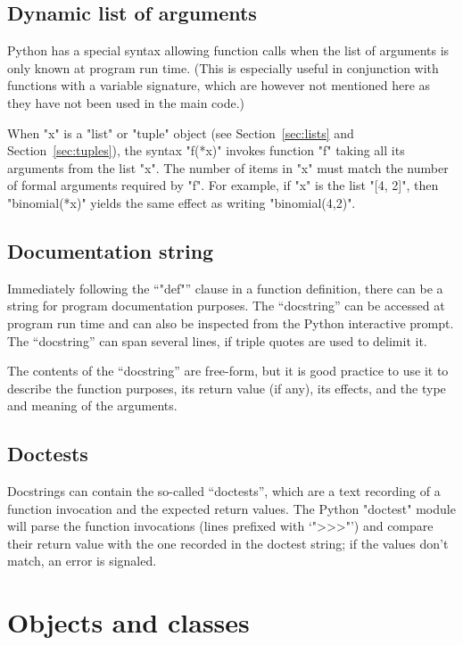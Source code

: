 {\subsection{Dynamic list of arguments}
\label{sec:fn-special-syntax}

Python has a special syntax allowing function calls when the list of
arguments is only known at program run time. (This is especially
useful in conjunction with functions with a variable signature, which
are however not mentioned here as they have not been used in the main
code.)

When "x" is a "list" or "tuple" object (see Section~\ref{sec:lists} and
Section~\ref{sec:tuples}), the syntax "f(*x)" invokes function "f"
taking all its arguments from the list "x".  The number of items in
"x" must match the number of formal arguments required by "f".  For
example, if "x" is the list "[4, 2]", then "binomial(*x)" yields the
same effect as writing "binomial(4,2)".

\subsection{Documentation string}
\label{sec:docstring}

Immediately following the ``"def"'' clause in a function definition,
there can be a string for program documentation purposes. The
``docstring'' can be accessed at program run time and can also be
inspected from the Python interactive prompt.  The ``docstring'' can
span several lines, if triple quotes are used to delimit it.

The contents of the ``docstring'' are free-form, but it is good
practice to use it to describe the function purposes, its return value
(if any), its effects, and the type and meaning of the arguments.

\subsection{Doctests}
\label{sec:doctests}

Docstrings can contain the so-called ``doctests'', which are a text
recording of a function invocation and the expected return values.
The Python "doctest" module will parse the function  invocations
(lines prefixed with `">>>"') and compare their return value with the
one recorded in the doctest string; if the values don't match, an
error is signaled. 

\section{Objects and classes}
\label{sec:objects}

}

